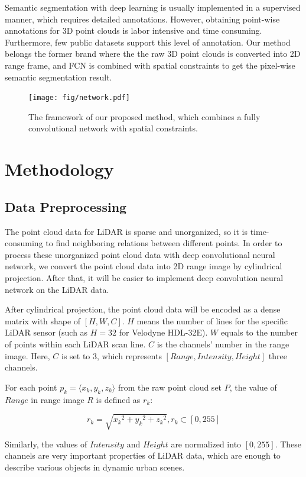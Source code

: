 Semantic segmentation with deep learning is usually implemented in a supervised manner, which requires detailed annotations. However, obtaining point-wise annotations for 3D point clouds is labor intensive and time consuming. Furthermore, few public datasets support this level of annotation. Our method belongs the former brand where the the raw 3D point clouds is converted into 2D range frame, and FCN is combined with spatial constraints to get the pixel-wise semantic segmentation result.

\begin{figure}[h]
	\centering
	\texttt{[image: fig/network.pdf]}
	\caption{The framework of our proposed method, which combines a fully convolutional network with spatial constraints.}
	\label{fig:network}
\end{figure}

\section{Methodology}

\subsection{Data Preprocessing}
The point cloud data for LiDAR is sparse and unorganized, so it is time-consuming to find neighboring relations between different points. In order to process these unorganized point cloud data with deep convolutional neural network, we convert the point cloud data into 2D range image by cylindrical projection. After that, it will be easier to implement deep convolution neural network on the LiDAR data.

After cylindrical projection, the point cloud data will be encoded as a dense matrix with shape of $[H,W,C]$. $H$ means the number of lines for the specific LiDAR sensor (such as $H=32$ for Velodyne HDL-32E). $W$ equals to the number of points within each LiDAR scan line. $C$ is the channels' number in the range image. Here, $C$ is set to 3, which represents $[Range,Intensity,Height]$ three channels.

For each point $p_k=\langle x_k,y_k,z_k\rangle$ from the raw point cloud set $P$, the value of $Range$ in range image $R$ is defined as $r_k$:

\begin{equation}
r_k=\sqrt{{x_k}^2+{y_k}^2+{z_k}^2},  r_k\subset [0,255]	
\end{equation} 

Similarly, the values of $Intensity$ and $Height$ are normalized into $[0,255]$. These channels are very important properties of LiDAR data, which are enough to describe various objects in dynamic urban scenes.

